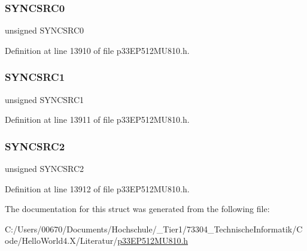 \subsubsection{\texorpdfstring{S\+Y\+N\+C\+S\+R\+C0}{SYNCSRC0}}
{\footnotesize\ttfamily unsigned S\+Y\+N\+C\+S\+R\+C0}



Definition at line 13910 of file p33\+E\+P512\+M\+U810.\+h.

\mbox{\label{structtag_s_t_c_o_n_b_i_t_s_aeee1112578ba6bcc147b15471e22e0c4}} 
\subsubsection{\texorpdfstring{S\+Y\+N\+C\+S\+R\+C1}{SYNCSRC1}}
{\footnotesize\ttfamily unsigned S\+Y\+N\+C\+S\+R\+C1}



Definition at line 13911 of file p33\+E\+P512\+M\+U810.\+h.

\mbox{\label{structtag_s_t_c_o_n_b_i_t_s_a510f85838b8ccfa7589c313ef0ab07c2}} 
\subsubsection{\texorpdfstring{S\+Y\+N\+C\+S\+R\+C2}{SYNCSRC2}}
{\footnotesize\ttfamily unsigned S\+Y\+N\+C\+S\+R\+C2}



Definition at line 13912 of file p33\+E\+P512\+M\+U810.\+h.



The documentation for this struct was generated from the following file\+:\begin{DoxyCompactItemize}
\item 
C\+:/\+Users/00670/\+Documents/\+Hochschule/\+\_\+\+Tier1/73304\+\_\+\+Technische\+Informatik/\+Code/\+Hello\+World4.\+X/\+Literatur/\hyperlink{p33_e_p512_m_u810_8h}{p33\+E\+P512\+M\+U810.\+h}\end{DoxyCompactItemize}
